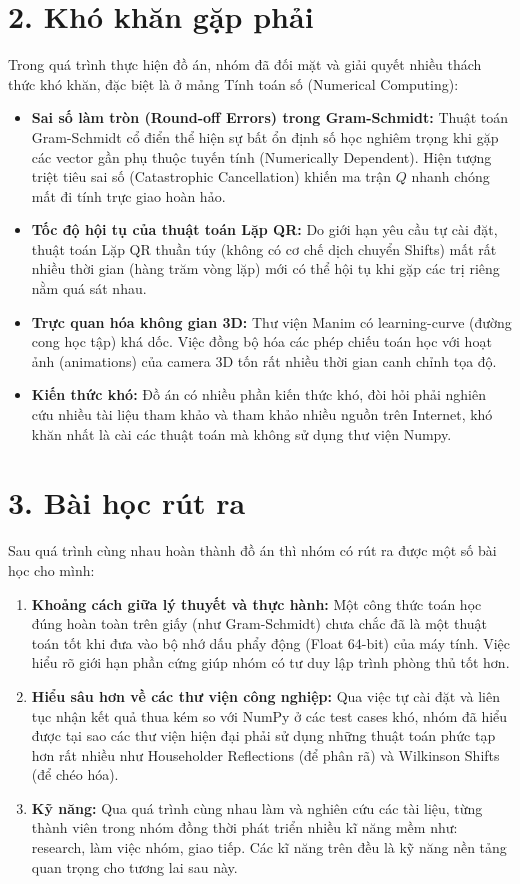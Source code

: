 \section*{2. Khó khăn gặp phải}
{}
Trong quá trình thực hiện đồ án, nhóm đã đối mặt và giải quyết nhiều thách thức khó khăn, đặc biệt là ở mảng Tính toán số (Numerical Computing):
\begin{itemize}
    \item \textbf{Sai số làm tròn (Round-off Errors) trong Gram-Schmidt:} Thuật toán Gram-Schmidt cổ điển thể hiện sự bất ổn định số học nghiêm trọng khi gặp các vector gần phụ thuộc tuyến tính (Numerically Dependent). Hiện tượng triệt tiêu sai số (Catastrophic Cancellation) khiến ma trận $Q$ nhanh chóng mất đi tính trực giao hoàn hảo.
    \item \textbf{Tốc độ hội tụ của thuật toán Lặp QR:} Do giới hạn yêu cầu tự cài đặt, thuật toán Lặp QR thuần túy (không có cơ chế dịch chuyển Shifts) mất rất nhiều thời gian (hàng trăm vòng lặp) mới có thể hội tụ khi gặp các trị riêng nằm quá sát nhau. 
    \item \textbf{Trực quan hóa không gian 3D:} Thư viện Manim có learning-curve (đường cong học tập) khá dốc. Việc đồng bộ hóa các phép chiếu toán học với hoạt ảnh (animations) của camera 3D tốn rất nhiều thời gian canh chỉnh tọa độ.
    \item \textbf{Kiến thức khó:} Đồ án có nhiều phần kiến thức khó, đòi hỏi phải nghiên cứu nhiều tài liệu tham khảo và tham khảo nhiều nguồn trên Internet, khó khăn nhất là cài các thuật toán mà không sử dụng thư viện Numpy.
\end{itemize}

\section*{3. Bài học rút ra}
{}
Sau quá trình cùng nhau hoàn thành đồ án thì nhóm có rút ra được một số bài học cho mình:
\begin{enumerate}
    \item \textbf{Khoảng cách giữa lý thuyết và thực hành:} Một công thức toán học đúng hoàn toàn trên giấy (như Gram-Schmidt) chưa chắc đã là một thuật toán tốt khi đưa vào bộ nhớ dấu phẩy động (Float 64-bit) của máy tính. Việc hiểu rõ giới hạn phần cứng giúp nhóm có tư duy lập trình phòng thủ tốt hơn.
    \item \textbf{Hiểu sâu hơn về các thư viện công nghiệp:} Qua việc tự cài đặt và liên tục nhận kết quả thua kém so với NumPy ở các test cases khó, nhóm đã hiểu được tại sao các thư viện hiện đại phải sử dụng những thuật toán phức tạp hơn rất nhiều như Householder Reflections (để phân rã) và Wilkinson Shifts (để chéo hóa).
    \item \textbf{Kỹ năng:} Qua quá trình cùng nhau làm và nghiên cứu các tài liệu, từng thành viên trong nhóm đồng thời phát triển nhiều kĩ năng mềm như: research, làm việc nhóm, giao tiếp. Các kĩ năng trên đều là kỹ năng nền tảng quan trọng cho tương lai sau này.
\end{enumerate}